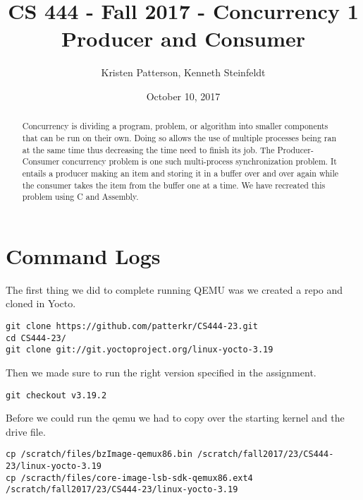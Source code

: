 \documentclass[10pt,letterpaper,onecolumn,draftclsnofoot]{IEEEtran}
\begin{document}
\begin{titlepage}

	\title{CS 444 - Fall 2017 - Concurrency 1 \\ Producer and Consumer}
	\author{Kristen Patterson, Kenneth Steinfeldt}
	\date{October 10, 2017}
	\maketitle
	\vspace{4cm}
	\begin{abstract}
		\noindent 
			\noindent
		Concurrency is dividing a program, problem, or algorithm into 
		smaller components that can be run on their own. Doing so allows 
		the use of multiple processes being ran at the same time thus 
		decreasing the time need to finish its job. The Producer-Consumer 
		concurrency problem is one such multi-process synchronization 
		problem. It entails a producer making an item and storing it in 
		a buffer over and over again while the consumer takes the item 
		from the buffer one at a time. We have recreated this problem 
		using C and Assembly.
	\end{abstract}
\end{titlepage}

\section{Command Logs}
The first thing we did to complete running QEMU was we created a repo and cloned in Yocto.

\begin{lstlisting}
git clone https://github.com/patterkr/CS444-23.git
cd CS444-23/
git clone git://git.yoctoproject.org/linux-yocto-3.19
\end{lstlisting}

Then we made sure to run the right version specified in the assignment.

\begin{lstlisting}
git checkout v3.19.2
\end{lstlisting}

Before we could run the qemu we had to copy over the starting kernel and the
drive file.

\begin{lstlisting}
cp /scratch/files/bzImage-qemux86.bin /scratch/fall2017/23/CS444-23/linux-yocto-3.19
cp /scracth/files/core-image-lsb-sdk-qemux86.ext4 /scratch/fall2017/23/CS444-23/linux-yocto-3.19
\end{lstlisting}
\end{document}

